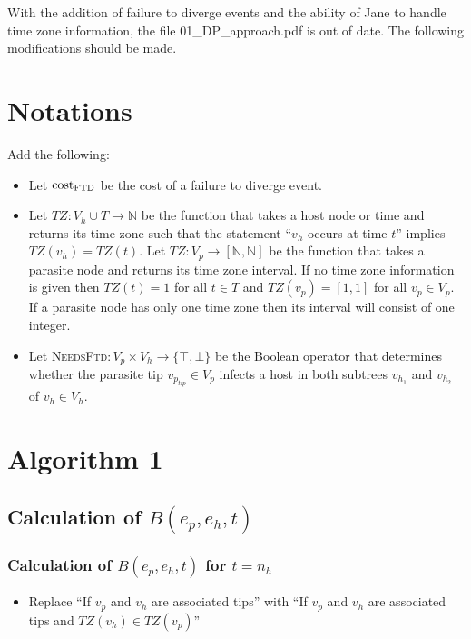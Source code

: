 \documentclass{article}
\begin{document}
With the addition of failure to diverge events and the ability of Jane to handle time zone information, the file 01\_DP\_approach.pdf is out of date. The following modifications should be made.

\section{Notations}
Add the following:
\begin{itemize}
\item Let $\text{cost}_{\textsc{FTD}}$ be the cost of a failure to diverge event.

\item Let $TZ: V_{h} \cup T \to \mathbb{N}$ be the function that takes a host node or time and returns its time zone such that the statement ``$v_{h}$ occurs at time $t$'' implies $TZ(v_{h}) = TZ(t)$. Let $TZ:V_{p} \to [\mathbb{N}, \mathbb{N}]$ be the function that takes a parasite node and returns its time zone interval. If no time zone information is given then $TZ(t) = 1$ for all $t \in T$ and $TZ(v_{p}) = [1,1]$ for all $v_{p} \in V_{p}$. If a parasite node has only one time zone then its interval will consist of one integer. 

\item Let \textsc{NeedsFtd}$: V_{p} \times V_{h} \to \{\top, \bot\}$ be the Boolean operator that determines whether the parasite tip $v_{p_{tip}} \in V_{p}$ infects a host in both subtrees $v_{h_{1}}$ and $v_{h_{2}}$ of $v_{h} \in V_{h}$. 

\end{itemize}

\section{Algorithm 1}
\subsection{Calculation of $B(e_{p}, e_{h}, t)$}
\subsubsection{Calculation of $B(e_{p}, e_{h}, t)$ for $t = n_{h}$}
\begin{itemize}
\item Replace ``If $v_{p}$ and $v_{h}$ are associated tips'' with ``If $v_{p}$ and $v_{h}$ are associated tips and $TZ(v_{h}) \in TZ(v_{p})$''
\end{itemize}
\end{document}
